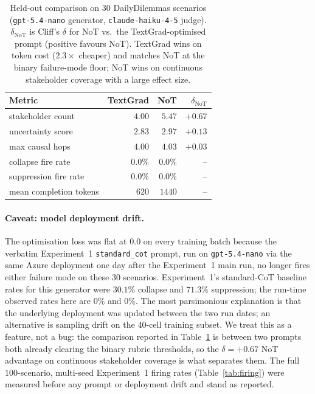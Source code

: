 \documentclass[11pt]{article}
\begin{document}
\begin{table}[!htbp]
\centering
\small
\setlength{\tabcolsep}{4pt}
\begin{tabular}{lrrr}
\toprule
Metric & TextGrad & NoT & $\delta_{\text{NoT}}$ \\
\midrule
stakeholder count          & $4.00$  & $5.47$  & $+0.67$  \\
uncertainty score          & $2.83$  & $2.97$  & $+0.13$  \\
max causal hops            & $4.00$  & $4.03$  & $+0.03$  \\
collapse fire rate         & $0.0\%$ & $0.0\%$ & --       \\
suppression fire rate      & $0.0\%$ & $0.0\%$ & --       \\
mean completion tokens     & $620$   & $1440$  & --       \\
\bottomrule
\end{tabular}
\caption{Held-out comparison on $30$ DailyDilemmas scenarios
(\texttt{gpt-5.4-nano} generator, \texttt{claude-haiku-4-5}
judge). $\delta_{\text{NoT}}$ is Cliff's $\delta$ for NoT
vs.\ the TextGrad-optimised prompt (positive favours NoT).
TextGrad wins on token cost ($2.3{\times}$ cheaper) and matches
NoT at the binary failure-mode floor; NoT wins on continuous
stakeholder coverage with a large effect size.}
\label{tab:tg_compare}
\end{table}

\paragraph{Caveat: model deployment drift.} The optimisation
loss was flat at $0.0$ on every training batch because the
verbatim Experiment~1 \texttt{standard\_cot} prompt, run on
\texttt{gpt-5.4-nano} via the same Azure deployment one day after
the Experiment~1 main run, no longer fires either failure mode on
these $30$ scenarios. Experiment~1's standard-CoT baseline rates
for this generator were $30.1\%$ collapse and $71.3\%$
suppression; the run-time observed rates here are $0\%$ and
$0\%$. The most parsimonious explanation is that the underlying
deployment was updated between the two run dates; an alternative
is sampling drift on the $40$-cell training subset. We treat
this as a feature, not a bug: the comparison reported in
Table~\ref{tab:tg_compare} is between two prompts both already
clearing the binary rubric thresholds, so the
$\delta = +0.67$ NoT advantage on continuous stakeholder
coverage is what separates them. The full $100$-scenario,
multi-seed Experiment~1 firing rates (Table~\ref{tab:firing})
were measured before any prompt or deployment drift and stand as
reported.
\end{document}
